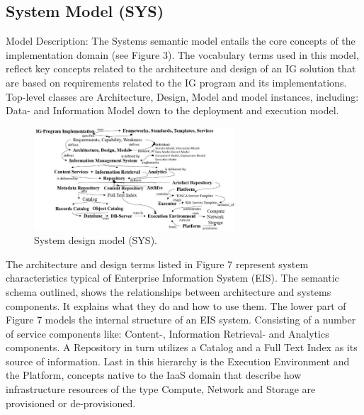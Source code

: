 \documentclass[a4paper,twoside]{article}
\begin{document}
\subsection{System Model (SYS)}
Model Description: The Systems semantic model entails the core concepts of the implementation domain (see Figure 3). The vocabulary terms used in this model, reflect key concepts related to the architecture and design of an IG solution that are based on requirements related to the IG program and its implementations. Top-level classes are Architecture, Design, Model and model instances, including: Data- and Information Model down to the deployment and execution model.
%
\begin{figure}[ht]
  \centering
    \includegraphics[width=7.5cm]{images/Fig7-IG.sys.Model.png}
    \caption{System design model (SYS).}
  \label{fig:sysmod}
\end{figure}
The architecture and design terms listed in Figure 7 represent system characteristics typical of Enterprise Information System (EIS). The semantic schema outlined, shows the relationships between architecture and systems components. It explains what they do and how to use them. The lower part of Figure 7 models the internal structure of an EIS system. Consisting of a number of service components like: Content-, Information Retrieval- and Analytics components. A Repository in turn utilizes a Catalog and a Full Text Index as its source of information. Last in this hierarchy is the Execution Environment and the Platform, concepts native to the IaaS domain that describe how infrastructure resources of the type Compute, Network and Storage are provisioned or de-provisioned.
\end{document}
